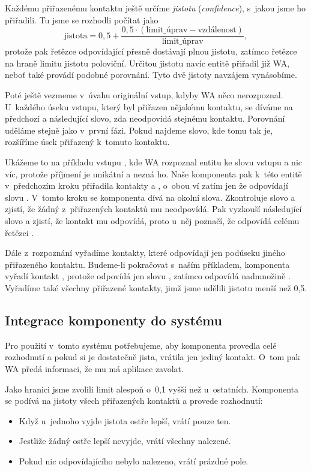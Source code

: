 Každému přiřazenému kontaktu ještě určíme \textit{jistotu} (\textit{confidence}),
s~jakou jsme ho přiřadili. Tu jsme se rozhodli počítat jako
\[ \text{jistota} = 0,5 + \frac{0,5 \cdot (\text{limit\_úprav} - \text{vzdálenost})}{\text{limit\_úprav}} ,\]
protože pak řetězce odpovídající přesně dostávají plnou jistotu, zatímco řetězce na
hraně limitu jistotu poloviční. Určitou jistotu navíc entitě přiřadil již WA,
neboť také provádí podobné porovnání. Tyto dvě jistoty navzájem vynásobíme.

Poté ještě vezmeme v~úvahu originální vstup, kdyby WA něco nerozpoznal. U~každého
úseku vstupu, který byl přiřazen nějakému kontaktu, se díváme na předchozí a následující
slovo, zda neodpovídá stejnému kontaktu. Porovnání uděláme stejně jako v~první fázi.
Pokud najdeme slovo, kde tomu tak je, rozšíříme úsek přiřazený k~tomuto kontaktu.

Ukážeme
to na příkladu vstupu , kde WA rozpoznal entitu 
ke slovu vstupu  a nic víc, protože příjmení je unikátní a nezná ho.
Naše komponenta pak k~této entitě v~předchozím kroku přiřadila
kontakty  a , o~obou ví zatím jen že odpovídají slovu .
V~tomto kroku se komponenta dívá na okolní slova.
Zkontroluje slovo  a zjistí, že žádný z~přiřazených kontaktů mu neodpovídá. Pak
vyzkouší následující slovo  a zjistí, že kontakt  mu odpovídá,
proto u~něj poznačí, že odpovídá celému řetězci .

Dále z~rozpoznání vyřadíme kontakty, které odpovídají jen podúseku jiného
přiřazeného kontaktu. Budeme-li pokračovat s~naším příkladem, komponenta vyřadí kontakt ,
protože odpovídá jen slovu , zatímco  odpovídá nadmnožině .
Vyřadíme také
všechny přiřazené kontakty, jimž jsme udělili jistotu menší než 0,5.

\subsection{Integrace komponenty do systému}\label{integration}

Pro použití v~tomto systému potřebujeme, aby komponenta provedla
celé rozhodnutí a pokud si je dostatečně jista, vrátila jen jediný kontakt.
O~tom pak WA předá informaci, že mu má aplikace zavolat.

Jako hranici  jsme zvolili limit alespoň o~0,1 vyšší než u~ostatních.
Komponenta se podívá na jistoty všech přiřazených kontaktů a provede rozhodnutí:
\begin{itemize}
    \item Když u~jednoho vyjde jistota ostře lepší, vrátí pouze ten.
    \item Jestliže žádný ostře lepší nevyjde, vrátí všechny nalezené.
    \item Pokud nic odpovídajícího nebylo nalezeno, vrátí prázdné pole.
\end{itemize}